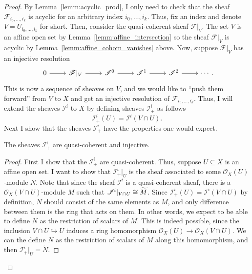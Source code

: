 \begin{proof}
  By Lemma~\ref{lemm:acyclic_prod}, I only need to check that the sheaf
  $\mathscr{F}_{i_{0},\ldots,i_{k}}$ is acyclic for an arbitrary index
  $i_{0},\ldots,i_{k}$. Thus, fix an index and denote $V=U_{i_{0},\ldots,i_{k}}$
  for short. Then, consider the quasi-coherent sheaf $\mathscr{F}\vert_{V}$.
  The set $V$ is an affine open set by Lemma~\ref{lemm:affine_intersection}
  so the sheaf $\mathscr{F}\vert_{V}$ is acyclic by
  Lemma~\ref{lemm:affine_cohom_vanishes} above. Now, suppose
  $\mathscr{F}\vert_{V}$ has an injective resolution
  \[\begin{tikzcd}
      0\rar & \mathscr{F}\vert_{V}\rar & \mathscr{I}^{0}\rar
      & \mathscr{I}^{1}\rar & \mathscr{I}^{2}\rar & \cdots
    \end{tikzcd}.\]
  This is now a sequence of sheaves on $V$, and we would like to
  ``push them forward'' from $V$ to $X$ and get an injective resolution of
  $\mathscr{F}_{i_{0},\ldots,i_{k}}$. Thus, I will extend the sheaves
  $\mathscr{I}^{i}$ to $X$ by defining sheaves $\mathscr{I}_{+}^{i}$ as follows
  \[
    \mathscr{I}_{+}^{i}(U)=\mathscr{I}^{i}(V\cap U).
  \]
  Next I show that the sheaves $\mathscr{I}_{+}^{i}$ have the properties
  one would expect.
  \begin{claim}
    The sheaves $\mathscr{I}_{+}^{i}$ are quasi-coherent and injective.
  \end{claim}
  {\renewcommand{\qedsymbol}{$\blacksquare$}
    \begin{proof}
      First I show that the $\mathscr{I}_{+}^{i}$ are quasi-coherent.
      Thus, suppose $U\subseteq X$ is an affine open set. I want to show
      that $\mathscr{I}_{+}^{i}\vert_{U}$ is the sheaf associated to some
      $\mathscr{O}_{X}(U)$-module $N$. Note that since the sheaf
      $\mathscr{I}^{i}$ is a quasi-coherent sheaf, there is a
      $\mathscr{O}_{X}(V\cap U)$-module $M$ such that
      $\mathscr{I}^{i}\vert_{V\cap U}\cong\widetilde{M}$. Since $\mathscr{I}_{+}^{i}(U)
      =\mathscr{I}^{i}(V\cap U)$ by definition, $N$ should consist of the same
      elements as $M$, and only difference between them is the ring that
      acts on them. In other words, we expect to be able to define $N$ as
      the restriction of scalars of $M$. This is indeed possible, since
      the inclusion $V\cap U\hookrightarrow U$ induces a ring homomorphism
      $\mathscr{O}_{X}(U)\to \mathscr{O}_{X}(V\cap U)$. We can the
      define $N$ as the restriction of scalars of $M$ along this
      homomorphism, and then $\mathscr{I}_{+}^{i}\vert_{U}=\widetilde{N}$.


\end{proof}}
\end{proof}
